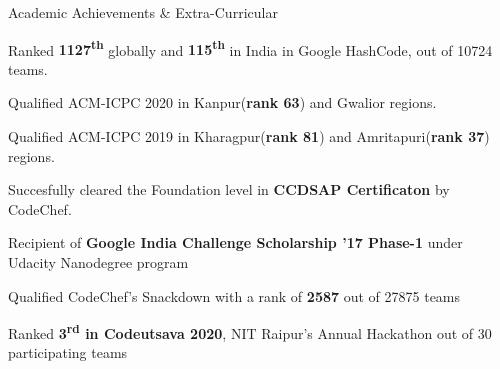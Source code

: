 \documentclass{resume} %
\begin{document}




\vspace{-0.25cm}
\begin{rSection}{Academic Achievements \& Extra-Curricular} 
\vspace{-0.475cm}
\begin{rSubsection}{}{}{}{}
\item Ranked \textbf{1127\textsuperscript{th}} globally and \textbf{115\textsuperscript{th}} in India in Google HashCode, out of 10724 teams.

\item Qualified ACM-ICPC 2020 in Kanpur(\textbf{rank 63}) and Gwalior regions.

\item Qualified ACM-ICPC 2019 in Kharagpur(\textbf{rank 81}) and Amritapuri(\textbf{rank 37}) regions.

\item Succesfully cleared the Foundation level in \textbf{CCDSAP Certificaton} by CodeChef.

\item Recipient of {\bf Google India Challenge Scholarship '17 Phase-1} under Udacity Nanodegree program

\item Qualified CodeChef's Snackdown with a rank of \textbf{2587} out of 27875 teams 

\item Ranked {\bf 3\textsuperscript{rd} in Codeutsava 2020}, NIT Raipur’s Annual Hackathon out of 30 participating teams


\end{rSubsection}

\end{rSection}

\end{document}
